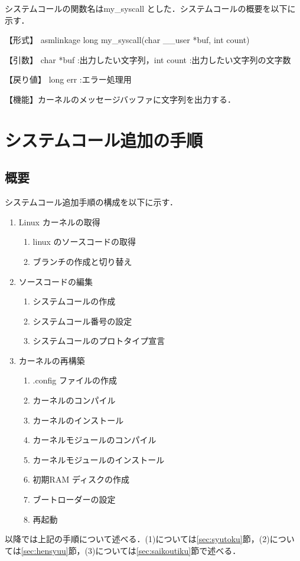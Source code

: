 \documentclass[12pt]{jsarticle}
\begin{document}
システムコールの関数名はmy\_syscall とした．システムコールの概要を以下に示す．

【形式】 asmlinkage long my\_syscall(char \_\_user *buf, int count)

【引数】 char *buf :出力したい文字列，int count :出力したい文字列の文字数

【戻り値】 long err :エラー処理用

【機能】カーネルのメッセージバッファに文字列を出力する．

\section{システムコール追加の手順}\label{sec:tejun}
 \subsection{概要}
システムコール追加手順の構成を以下に示す．
\begin{enumerate}
\item Linux カーネルの取得
  \begin{enumerate}
  \item linux のソースコードの取得
  \item ブランチの作成と切り替え
  \end{enumerate}
\item ソースコードの編集
  \begin{enumerate}
  \item システムコールの作成
  \item システムコール番号の設定
  \item システムコールのプロトタイプ宣言
  \end{enumerate}
\item カーネルの再構築
  \begin{enumerate}
  \item .config ファイルの作成
  \item カーネルのコンパイル
  \item カーネルのインストール
  \item カーネルモジュールのコンパイル
  \item カーネルモジュールのインストール
  \item 初期RAM ディスクの作成
  \item ブートローダーの設定
  \item 再起動
  \end{enumerate}
\end{enumerate}
以降では上記の手順について述べる．(1)については\ref{sec:syutoku}節，(2)については\ref{sec:hensyuu}節，(3)については\ref{sec:saikoutiku}節で述べる．
\end{document}
